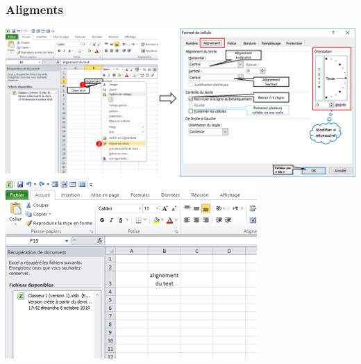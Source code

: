 \subsubsection{Aligments}
\begin{center}  
	\includegraphics[scale=0.2,width= \linewidth]{img/aligment_text}
	\includegraphics[scale=0.2,width= \linewidth]{img/aligment_exemple}
\end{center}
